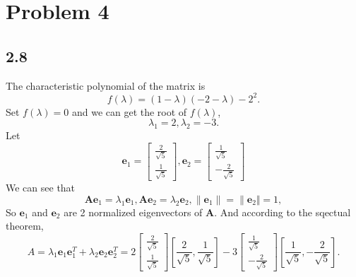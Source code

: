 \documentclass{article}
\begin{document}
\section*{Problem 4}
\subsection*{2.8}
The characteristic polynomial of the matrix is
\begin{equation*}
  f(\lambda) = (1-\lambda)(-2-\lambda) - 2^2.
\end{equation*}
Set $f(\lambda) = 0$ and we can get the root of $f(\lambda)$,
\begin{equation*}
  \lambda_1 = 2, \lambda_2 = -3.
\end{equation*}
Let
\begin{equation*}
  \mathbf{e}_1 = \left[
    \begin{matrix}
      \frac{2}{\sqrt{5}}\\
      \frac{1}{\sqrt{5}}
    \end{matrix}\right],
  \mathbf{e}_2 = \left[
    \begin{matrix}
      \frac{1}{\sqrt{5}}\\
      -\frac{2}{\sqrt{5}}
    \end{matrix}\right]
\end{equation*}
We can see that
\begin{equation*}
  \mathbf{Ae}_1 = \lambda_1\mathbf{e}_1, \mathbf{Ae}_2 = \lambda_2\mathbf{e}_2, \lVert \mathbf{e}_1 \rVert = \lVert \mathbf{e}_2 \Vert = 1,
\end{equation*}
So $\mathbf{e}_1$ and $\mathbf{e}_2$ are 2 normalized eigenvectors of $\mathbf{A}$.
And according to the sqectual theorem,
\begin{equation*}
  A = \lambda_1\mathbf{e}_1\mathbf{e}_1^T + \lambda_2\mathbf{e}_2\mathbf{e}_2^T = 2\left[
    \begin{matrix}
      \frac{2}{\sqrt{5}}\\
      \frac{1}{\sqrt{5}}
    \end{matrix}\right]\left[\frac{2}{\sqrt{5}}, \frac{1}{\sqrt{5}}\right] - 3\left[
    \begin{matrix}
      \frac{1}{\sqrt{5}}\\
      -\frac{2}{\sqrt{5}}
    \end{matrix}\right]\left[\frac{1}{\sqrt{5}} ,- \frac{2}{\sqrt{5}}\right].
\end{equation*}
\end{document}
